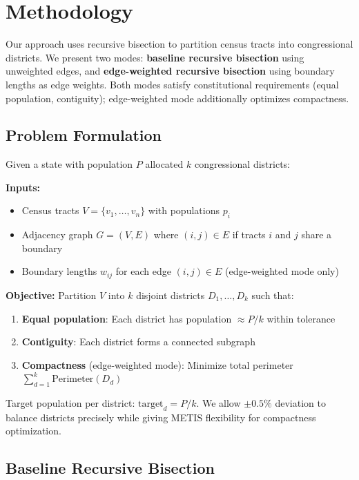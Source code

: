 \section{Methodology}

Our approach uses recursive bisection to partition census tracts into congressional districts. We present two modes: \textbf{baseline recursive bisection} using unweighted edges, and \textbf{edge-weighted recursive bisection} using boundary lengths as edge weights. Both modes satisfy constitutional requirements (equal population, contiguity); edge-weighted mode additionally optimizes compactness.

\subsection{Problem Formulation}

Given a state with population $P$ allocated $k$ congressional districts:

\textbf{Inputs:}
\begin{itemize}
\item Census tracts $V = \{v_1, \ldots, v_n\}$ with populations $p_i$
\item Adjacency graph $G = (V, E)$ where $(i,j) \in E$ if tracts $i$ and $j$ share a boundary
\item Boundary lengths $w_{ij}$ for each edge $(i,j) \in E$ (edge-weighted mode only)
\end{itemize}

\textbf{Objective:}
Partition $V$ into $k$ disjoint districts $D_1, \ldots, D_k$ such that:

\begin{enumerate}
\item \textbf{Equal population}: Each district has population $\approx P/k$ within tolerance
\item \textbf{Contiguity}: Each district forms a connected subgraph
\item \textbf{Compactness} (edge-weighted mode): Minimize total perimeter $\sum_{d=1}^k \text{Perimeter}(D_d)$
\end{enumerate}

Target population per district: $\text{target}_d = P/k$. We allow $\pm 0.5\%$ deviation to balance districts precisely while giving METIS flexibility for compactness optimization.

\subsection{Baseline Recursive Bisection}

